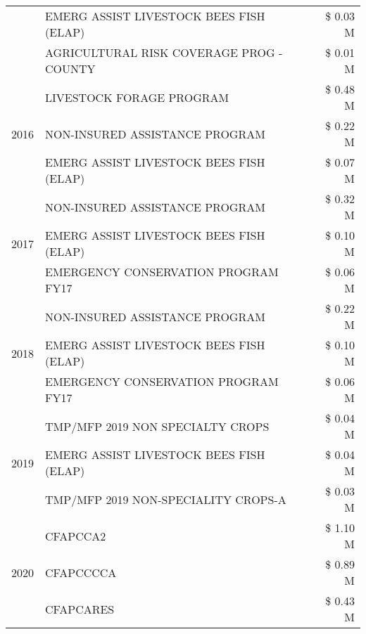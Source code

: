 \begin{tabular}{llr}
 & EMERG ASSIST LIVESTOCK BEES FISH (ELAP) & \$ 0.03 M \\
 & AGRICULTURAL RISK COVERAGE PROG - COUNTY & \$ 0.01 M \\
\cline{1-3}
\multirow[t]{3}{*}{2016} & LIVESTOCK FORAGE PROGRAM & \$ 0.48 M \\
 & NON-INSURED ASSISTANCE PROGRAM & \$ 0.22 M \\
 & EMERG ASSIST LIVESTOCK BEES FISH (ELAP) & \$ 0.07 M \\
\cline{1-3}
\multirow[t]{3}{*}{2017} & NON-INSURED ASSISTANCE PROGRAM & \$ 0.32 M \\
 & EMERG ASSIST LIVESTOCK BEES FISH (ELAP) & \$ 0.10 M \\
 & EMERGENCY CONSERVATION PROGRAM FY17 & \$ 0.06 M \\
\cline{1-3}
\multirow[t]{3}{*}{2018} & NON-INSURED ASSISTANCE PROGRAM & \$ 0.22 M \\
 & EMERG ASSIST LIVESTOCK BEES FISH (ELAP) & \$ 0.10 M \\
 & EMERGENCY CONSERVATION PROGRAM FY17 & \$ 0.06 M \\
\cline{1-3}
\multirow[t]{3}{*}{2019} & TMP/MFP 2019 NON SPECIALTY CROPS & \$ 0.04 M \\
 & EMERG ASSIST LIVESTOCK BEES FISH (ELAP) & \$ 0.04 M \\
 & TMP/MFP 2019 NON-SPECIALITY CROPS-A & \$ 0.03 M \\
\cline{1-3}
\multirow[t]{3}{*}{2020} & CFAPCCA2 & \$ 1.10 M \\
 & CFAPCCCCA & \$ 0.89 M \\
 & CFAPCARES & \$ 0.43 M \\
\cline{1-3}
\bottomrule
\end{tabular}
